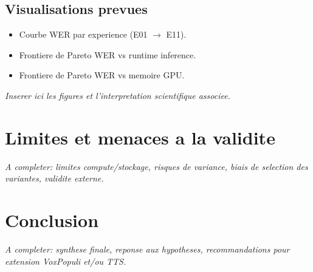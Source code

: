 \documentclass[11pt,a4paper]{article}
\begin{document}
\subsection{Visualisations prevues}
\begin{itemize}
\item Courbe WER par experience (E01 $\rightarrow$ E11).
\item Frontiere de Pareto WER vs runtime inference.
\item Frontiere de Pareto WER vs memoire GPU.
\end{itemize}
\textit{Inserer ici les figures et l'interpretation scientifique associee.}


\section{Limites et menaces a la validite}
\textit{A completer: limites compute/stockage, risques de variance, biais de selection des variantes, validite externe.}

\section{Conclusion}
\textit{A completer: synthese finale, reponse aux hypotheses, recommandations pour extension VoxPopuli et/ou TTS.}
\end{document}
